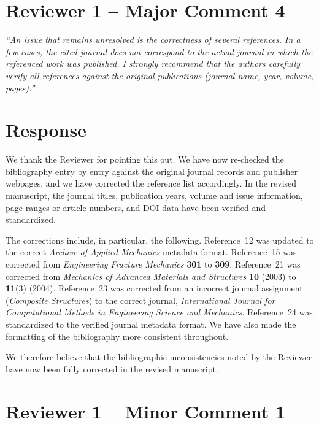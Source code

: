 \documentclass[12pt,a4paper]{article}
\begin{document}
	\section*{Reviewer 1 -- Major Comment 4}
	
	\begin{tcolorbox}[reviewerbox]
		\emph{``An issue that remains unresolved is the correctness of several references. In a few cases, the cited journal does not correspond to the actual journal in which the referenced work was published. I strongly recommend that the authors carefully verify all references against the original publications (journal name, year, volume, pages).''}
	\end{tcolorbox}
	
	\section*{Response}
	
	\begin{tcolorbox}[authorbox]
		We thank the Reviewer for pointing this out. We have now re-checked the bibliography entry by entry against the original journal records and publisher webpages, and we have corrected the reference list accordingly. In the revised manuscript, the journal titles, publication years, volume and issue information, page ranges or article numbers, and DOI data have been verified and standardized.
		
		The corrections include, in particular, the following. Reference~12 was updated to the correct \emph{Archive of Applied Mechanics} metadata format. Reference~15 was corrected from \emph{Engineering Fracture Mechanics} \textbf{301} to \textbf{309}. Reference~21 was corrected from \emph{Mechanics of Advanced Materials and Structures} \textbf{10} (2003) to \textbf{11}(3) (2004). Reference~23 was corrected from an incorrect journal assignment (\emph{Composite Structures}) to the correct journal, \emph{International Journal for Computational Methods in Engineering Science and Mechanics}. Reference~24 was standardized to the verified journal metadata format. We have also made the formatting of the bibliography more consistent throughout.
		
		We therefore believe that the bibliographic inconsistencies noted by the Reviewer have now been fully corrected in the revised manuscript.
	\end{tcolorbox}
	
	\section*{Reviewer 1 -- Minor Comment 1}
	
\end{document}
